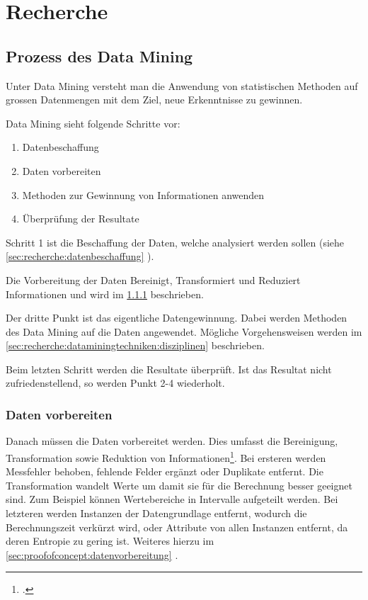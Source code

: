 \chapter{Recherche}
\label{sec:recherche}

\section{Prozess des Data Mining}
\label{sec:recherche:dataminingtechniken}
Unter Data Mining versteht man die Anwendung von statistischen Methoden auf grossen Datenmengen mit dem Ziel, neue Erkenntnisse zu gewinnen.

Data Mining sieht folgende Schritte vor:
\begin{enumerate}
	\item Datenbeschaffung
	\item Daten vorbereiten
	\item Methoden zur Gewinnung von Informationen anwenden
	\item Überprüfung der Resultate
\end{enumerate}

Schritt 1 ist die Beschaffung der Daten, welche analysiert werden sollen (siehe \cref{sec:recherche:datenbeschaffung} ). 

Die Vorbereitung der Daten Bereinigt, Transformiert und Reduziert Informationen und wird im \cref{sec:recherche:dataminingtechniken:datenvorbereiten}  beschrieben.

Der dritte Punkt ist das eigentliche Datengewinnung. Dabei werden Methoden des Data Mining auf die Daten angewendet. Mögliche Vorgehensweisen werden im \cref{sec:recherche:dataminingtechniken:disziplinen}  beschrieben.

Beim letzten Schritt werden die Resultate überprüft. Ist das Resultat nicht zufriedenstellend, so werden Punkt 2-4 wiederholt.

\subsection{Daten vorbereiten}
\label{sec:recherche:dataminingtechniken:datenvorbereiten}

Danach müssen die Daten vorbereitet werden. Dies umfasst die Bereinigung, Transformation sowie Reduktion von Informationen\footcite{feature_selection_2017-01-04}. Bei ersteren werden Messfehler behoben, fehlende Felder ergänzt oder Duplikate entfernt. Die Transformation wandelt Werte um damit sie für die Berechnung besser geeignet sind. Zum Beispiel können Wertebereiche in Intervalle aufgeteilt werden. Bei letzteren werden Instanzen der Datengrundlage entfernt, wodurch die Berechnungszeit verkürzt wird, oder Attribute von allen Instanzen entfernt, da deren Entropie zu gering ist. Weiteres hierzu im \cref{sec:proofofconcept:datenvorbereitung} . 


